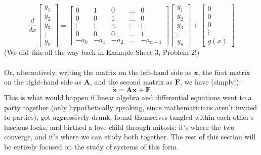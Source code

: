 \documentclass{article}
\begin{document}
\begin{equation*}
    \frac{d}{dx}\begin{bmatrix}
        y_1\\
        y_2\\
        y_3\\
        \vdots\\
        y_n
    \end{bmatrix}=
    \begin{bmatrix}
        0 & 1 & 0 & \dots & 0 \\
        0 & 0 & 1 & \dots & 0 \\
        \vdots & \vdots & \ddots & \vdots & \vdots \\
        0 & 0 & 0 & \dots & 1 \\
        -a_0 & -a_1 & -a_2 & \dots & -a_{n-1}
    \end{bmatrix}
    \begin{bmatrix}
        y_1\\
        y_2\\
        y_3\\
        \vdots\\
        y_n
    \end{bmatrix} + 
    \begin{bmatrix}
        0\\
        0\\
        0\\
        \vdots\\
        g(x)
    \end{bmatrix}
\end{equation*}
(We did this all the way back in Example Sheet 3, Problem 2!) \\ \\
Or, alternatively, writing the matrix on the left-hand side as $\mathbf{x}$, the first matrix on the right-hand side as $\mathbf{A}$, and the second matrix as $\mathbf{F}$, we have (simply!):
\begin{equation*}
    \dot{\mathbf{x}} = \mathbf{A}\mathbf{x} + \mathbf{F}
\end{equation*}
This is what would happen if linear algebra and differential equations went to a party together (only hypothetically speaking, since mathematicians aren't invited to parties), got aggressively drunk, found themselves tangled within each other's luscious locks, and birthed a love-child through mitosis; it's where the two converge, and it's where we can study both together. The rest of this section will be entirely focused on the study of systems of this form.
\end{document}
